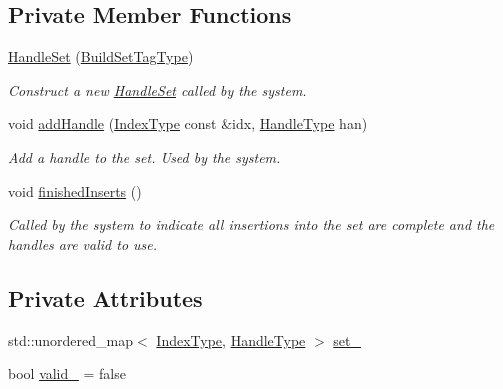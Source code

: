 \subsection*{Private Member Functions}
\begin{DoxyCompactItemize}
\item 
\hyperlink{structvt_1_1rdma_1_1_handle_set_aa6ee5e632ebe755859acc38c1fe6f064}{Handle\+Set} (\hyperlink{structvt_1_1rdma_1_1_handle_set_1_1_build_set_tag_type}{Build\+Set\+Tag\+Type})
\begin{DoxyCompactList}\small\item\em Construct a new {\ttfamily \hyperlink{structvt_1_1rdma_1_1_handle_set}{Handle\+Set}} called by the system. \end{DoxyCompactList}\item 
void \hyperlink{structvt_1_1rdma_1_1_handle_set_a870d2596189da0477b434b268e1c2137}{add\+Handle} (\hyperlink{structvt_1_1rdma_1_1_handle_set_aa0dbb6a47c459fb4290f0ca96e573097}{Index\+Type} const \&idx, \hyperlink{structvt_1_1rdma_1_1_handle_set_ab3a698ee86bae503dfa84617205b2dd9}{Handle\+Type} han)
\begin{DoxyCompactList}\small\item\em Add a handle to the set. Used by the system. \end{DoxyCompactList}\item 
void \hyperlink{structvt_1_1rdma_1_1_handle_set_ad5b51f17e95368c892480eebc7d4aa76}{finished\+Inserts} ()
\begin{DoxyCompactList}\small\item\em Called by the system to indicate all insertions into the set are complete and the handles are valid to use. \end{DoxyCompactList}\end{DoxyCompactItemize}
\subsection*{Private Attributes}
\begin{DoxyCompactItemize}
\item 
std\+::unordered\+\_\+map$<$ \hyperlink{structvt_1_1rdma_1_1_handle_set_aa0dbb6a47c459fb4290f0ca96e573097}{Index\+Type}, \hyperlink{structvt_1_1rdma_1_1_handle_set_ab3a698ee86bae503dfa84617205b2dd9}{Handle\+Type} $>$ \hyperlink{structvt_1_1rdma_1_1_handle_set_a1864dc0d064a06915f3ceb2e6e13f875}{set\+\_\+}
\item 
bool \hyperlink{structvt_1_1rdma_1_1_handle_set_a60d4c2fb59c226743eb8d9cb79d00e7a}{valid\+\_\+} = false
\end{DoxyCompactItemize}
